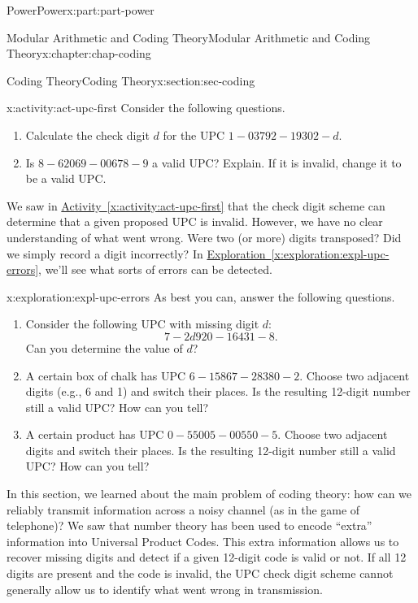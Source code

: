 \documentclass[oneside,10pt,]{book}
\newcommand{\xreffont}{\relax}
\numberwithin{equation}{section}
\begin{document}
\begin{partptx}{Power}{}{Power}{}{}{x:part:part-power}
\begin{chapterptx}{Modular Arithmetic and Coding Theory}{}{Modular Arithmetic and Coding Theory}{}{}{x:chapter:chap-coding}
\begin{sectionptx}{Coding Theory}{}{Coding Theory}{}{}{x:section:sec-coding}
\begin{activity}{}{x:activity:act-upc-first}%
Consider the following questions.%
%
\begin{enumerate}
\item{}Calculate the check digit \(d\) for the UPC \(1-03792 -19302-d\).%
\item{}Is \(8-62069-00678-9\) a valid UPC? Explain. If it is invalid, change it to be a valid UPC.%
\end{enumerate}
\end{activity}%
We saw in \hyperref[x:activity:act-upc-first]{Activity~{\xreffont\ref{x:activity:act-upc-first}}} that the check digit scheme can determine that a given proposed UPC is invalid. However, we have no clear understanding of what went wrong. Were two (or more) digits transposed? Did we simply record a digit incorrectly? In \hyperref[x:exploration:expl-upc-errors]{Exploration~{\xreffont\ref{x:exploration:expl-upc-errors}}}, we'll see what sorts of errors can be detected.%
\begin{exploration}{}{x:exploration:expl-upc-errors}%
As best you can, answer the following questions.%
%
\begin{enumerate}
\item{}Consider the following UPC with missing digit \(d\):%
\begin{equation*}
7-2d920-16431-8.
\end{equation*}
Can you determine the value of \(d\)?%
\item{}A certain box of chalk has UPC \(6-15867-28380-2\). Choose two adjacent digits (e.g., 6 and 1) and switch their places. Is the resulting 12-digit number still a valid UPC? How can you tell?%
\item{}A certain product has UPC \(0-55005-00550-5\). Choose two adjacent digits and switch their places. Is the resulting 12-digit number still a valid UPC? How can you tell?%
\end{enumerate}
\end{exploration}%
\begin{conclusion}{}%
In this section, we learned about the main problem of coding theory: how can we reliably transmit information across a noisy channel (as in the game of telephone)? We saw that number theory has been used to encode ``extra'' information into Universal Product Codes. This extra information allows us to recover missing digits and detect if a given 12-digit code is valid or not. If all 12 digits are present and the code is invalid, the UPC check digit scheme cannot generally allow us to identify what went wrong in transmission.%

\end{conclusion}
\end{sectionptx}
\end{chapterptx}
\end{partptx}
\end{document}
